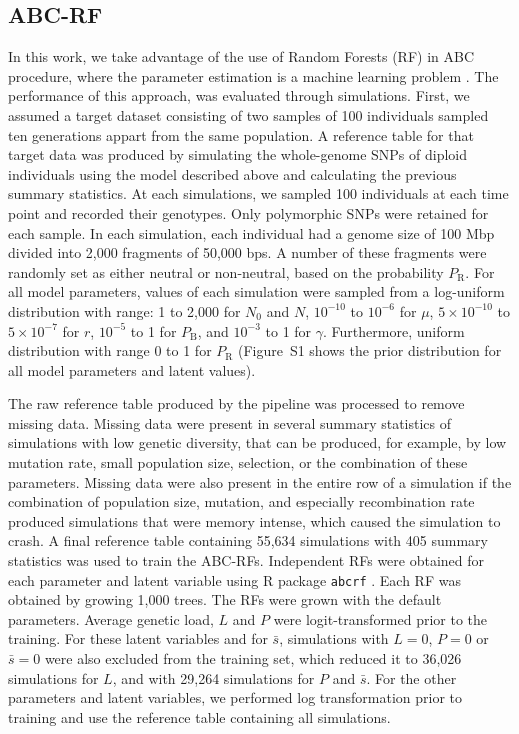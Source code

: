 \documentclass[a4paper, 12pt]{article}
\begin{document}
\subsection*{ABC-RF}

In this work, we take advantage of the use of Random Forests (RF) in ABC procedure, where the parameter estimation is a machine learning problem \citep{Pudlo:2016il, Raynal:2019jj}. The performance of this approach, was evaluated through simulations. First, we assumed a target dataset consisting of two samples of 100 individuals sampled ten generations appart from the same population. A reference table for that target data was produced by simulating the whole-genome SNPs of diploid individuals using the model described above and calculating the previous summary statistics. At each simulations, we sampled 100 individuals at each time point and recorded their genotypes. Only polymorphic SNPs were retained for each sample. In each simulation, each individual had a genome size of 100 Mbp divided into 2,000 fragments of 50,000 bps. A number of these fragments were randomly set as either neutral or non-neutral, based on the probability $P_{\mathrm{R}}$. For all model parameters, values of each simulation were sampled from a log-uniform distribution with range: 1 to 2,000 for $N_\mathrm{0}$ and $N$, $10^{-10}$ to $10^{-6}$ for $\mu$, $5\times 10^{-10}$ to $5\times 10^{-7}$ for $r$, $10^{-5}$ to 1 for $P_{\mathrm{B}}$, and $10^{-3}$ to 1 for $\gamma$. Furthermore, uniform distribution with range 0 to 1 for $P_{\mathrm{R}}$ (Figure~S1 shows the prior distribution for all model parameters and latent values).

The raw reference table produced by the pipeline was processed to remove missing data. Missing data were present in several summary statistics of simulations with low genetic diversity, that can be produced, for example, by low mutation rate, small population size, selection, or the combination of these parameters. Missing data were also present in the entire row of a simulation if the combination of population size, mutation, and especially recombination rate produced simulations that were memory intense, which caused the simulation to crash. A final reference table containing 55,634 simulations with 405 summary statistics was used to train the ABC-RFs. Independent RFs were obtained for each parameter and latent variable using R package \texttt{abcrf} \citep{Pudlo:2016il, Raynal:2019jj}. Each RF was obtained by growing 1,000 trees. The RFs were grown with the default parameters. Average genetic load, $L$ and $P$ were logit-transformed prior to the training. For these latent variables and for $\bar{s}$, simulations with $L=0$, $P=0$ or $\bar{s} = 0$ were also excluded from the training set, which reduced it to 36,026 simulations for $L$, and with 29,264 simulations for $P$ and $\bar{s}$. For the other parameters and latent variables, we performed log transformation prior to training and use the reference table containing all simulations.
\end{document}
